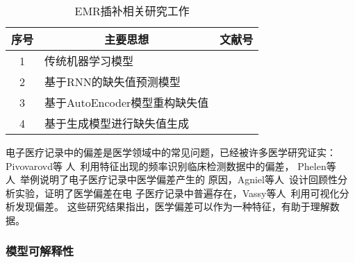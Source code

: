 \begin{table}
    \renewcommand\arraystretch{1.5}
    \begin{small}
        \caption{EMR插补相关研究工作}
        \label{tab:imputation}
        \begin{center}
            \begin{tabular}[c]{cll}
                \toprule
                \multicolumn{1}{c}{\textbf{序号}} &
                \multicolumn{1}{c}{\textbf{主要思想}} &
                \multicolumn{1}{c}{\textbf{文献号}}\\
                \midrule
                1 & 传统机器学习模型 & \cite{zheng2017resolving}
                \cite{beaulieu2018characterizing} \cite{yang2018time} \cite{xu2019estimating} \cite{sterne2009multiple}
                \\
                2 & 基于RNN的缺失值预测模型 &
                \cite{che2018recurrent} \cite{suo2019recurrent}
                ~\cite{cao2018brits} \\
                3 & 基于AutoEncoder模型重构缺失值 & \cite{beaulieu2017missing}
                \cite{costa2018missing} \\
                4 & 基于生成模型进行缺失值生成 & \cite{luo2018multivariate}
                \cite{luo20192} \cite{yoon2018gain} \cite{mattei2019miwae} \\
               \bottomrule
            \end{tabular}
        \end{center}
    \end{small}
\end{table}

电子医疗记录中的偏差是医学领域中的常见问题，已经被许多医学研究证实：Pivovarovd等
人~利用特征出现的频率识别临床检测数据中的偏差，
Phelen等人~举例说明了电子医疗记录中医学偏差产生的
原因，Agniel等人~设计回顾性分析实验，证明了医学偏差在电
子医疗记录中普遍存在，Vassy等人~利用可视化分析发现偏差。
这些研究结果指出，医学偏差可以作为一种特征，有助于理解数据。

{}

\subsubsection{模型可解释性}

